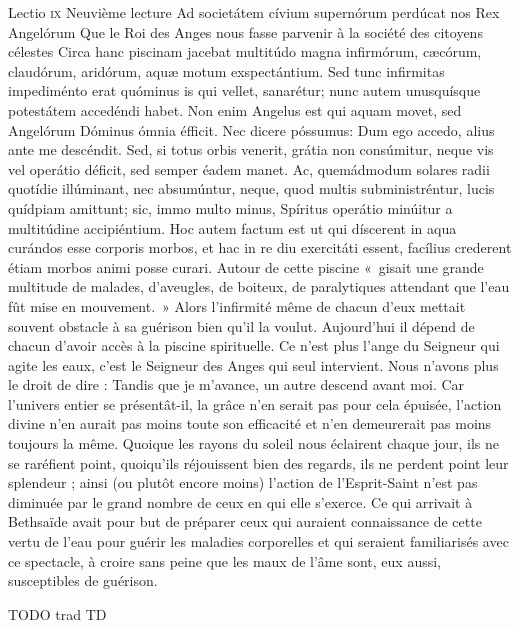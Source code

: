 \documentclass[twoside]{article}
\begin{document}
\begin{paracol}[1]{2}
\lectioresponsorium
	{Lectio \textsc{ix}}
	{Neuvième lecture}
	{Ad societátem cívium supernórum perdúcat nos Rex Angelórum}
	{Que le Roi des Anges nous fasse parvenir à la société des citoyens célestes}
	{
		Circa hanc piscinam jacebat multitúdo magna infirmórum, cæcórum, claudórum, aridórum, aquæ motum exspectántium. Sed tunc infirmitas impediménto erat quóminus is qui vellet, sanarétur; nunc autem unusquísque potestátem accedéndi habet. Non enim Angelus est qui aquam movet, sed Angelórum Dóminus ómnia éfficit. Nec dicere póssumus: Dum ego accedo, alius ante me descéndit. Sed, si totus orbis venerit, grátia non consúmitur, neque vis vel operátio déficit, sed semper éadem manet. Ac, quemádmodum solares radii quotídie illúminant, nec absumúntur, neque, quod multis subministréntur, lucis quídpiam amittunt; sic, immo multo minus, Spíritus operátio minúitur a multitúdine accipiéntium. Hoc autem factum est ut qui díscerent in aqua curándos esse corporis morbos, et hac in re diu exercitáti essent, facílius crederent étiam morbos animi posse curari.
	}
	{
		Autour de cette piscine «~gisait une grande multitude de malades, d’aveugles, de boiteux, de paralytiques attendant que l’eau fût mise en mouvement.~» Alors l’infirmité même de chacun d’eux mettait souvent obstacle à sa guérison bien qu’il la voulut. Aujourd’hui il dépend de chacun d’avoir accès à la piscine spirituelle. Ce n’est plus l’ange du Seigneur qui agite les eaux, c’est le Seigneur des Anges qui seul intervient. Nous n’avons plus le droit de dire : Tandis que je m’avance, un autre descend avant moi. Car l’univers entier se présentât-il, la grâce n’en serait pas pour cela épuisée, l’action divine n’en aurait pas moins toute son efficacité et n’en demeurerait pas moins toujours la même. Quoique les rayons du soleil nous éclairent chaque jour, ils ne se raréfient point, quoiqu’ils réjouissent bien des regards, ils ne perdent point leur splendeur ; ainsi (ou plutôt encore moins) l’action de l’Esprit-Saint n’est pas diminuée par le grand nombre de ceux en qui elle s’exerce. Ce qui arrivait à Bethsaïde avait pour but de préparer ceux qui auraient connaissance de cette vertu de l’eau pour guérir les maladies corporelles et qui seraient familiarisés avec ce spectacle, à croire sans peine que les maux de l’âme sont, eux aussi, susceptibles de guérison.
	}
	{}
	{}
	

\switchcolumn

TODO trad TD

\switchcolumn*


\end{paracol}
\end{document}
